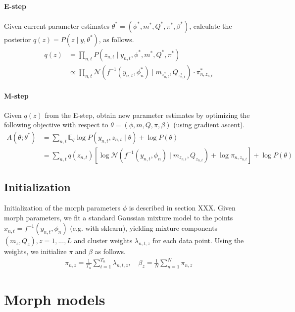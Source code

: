 \documentclass{article}         %
\newcommand{\EE}{\mathbb{E}}
\newcommand{\NN}{\mathcal{N}}
\begin{document}
\paragraph{E-step} Given current parameter estimates $\theta^* = (\phi^*, m^*, Q^*, \pi^*, \beta^*)$, calculate the posterior $q(z) = P(z \mid y, \theta^*)$, as follows.
%
\begin{align}
    q(z) & = \prod_{n,t} P(z_{n,t} \mid y_{n,t}, \phi^*, m^*, Q^*, \pi^*) \\
    & \propto  \prod_{n,t}  \NN(f^{-1}(y_{n,t}, \phi^*_n) \mid m_{z_{n,t}^*}, Q_{z_{n,t}^*}) \cdot \pi_{n,z_{n,t}}^* \label{eq:q-propto-statement}
\end{align}

\paragraph{M-step} Given $q(z)$ from the E-step, obtain new parameter estimates by optimizing the following objective with respect to $\theta = (\phi, m, Q, \pi, \beta)$ (using gradient ascent).
\begin{align}
    A(\theta; \theta^*) & = \sum_{n,t} \EE_q \log P(y_{n,t}, z_{n,t} \mid \theta) + \log P(\theta) \\
    & =  \sum_{n,t} q(z_{n,t}) \left[ \log \NN(f^{-1}(y_{n,t}, \phi_n) \mid m_{z_{n,t}}, Q_{z_{n,t}}) + \log \pi_{n, z_{n, t}} \right] + \log P(\theta) \label{eq:A-modeled}
\end{align}

\subsection{Initialization}
Initialization of the morph parameters $\phi$ is described in section XXX. Given morph parameters, we fit a standard Gaussian mixture model to the points $x_{n,t} = f^{-1}(y_{n,t}, \phi_n)$ (e.g. with sklearn), yielding mixture components $(m_z, Q_z), z=1,...,L$ and cluster weights $\lambda_{n,t,z}$ for each data point. Using the weights, we initialize $\pi$ and $\beta$ as follows.
\begin{align}
    \pi_{n,z} = \frac{1}{T_n} \sum_{t=1}^{T_n} \lambda_{n,t,z}, \quad \beta_z = \frac{1}{N} \sum_{n=1}^N \pi_{n,z}
\end{align}

\section{Morph models}
\end{document}

